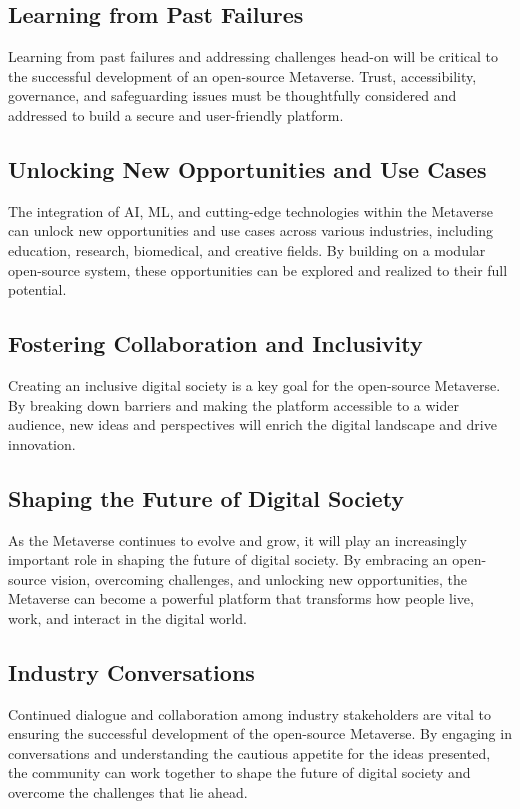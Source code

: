 \subsection{Learning from Past Failures}
Learning from past failures and addressing challenges head-on will be critical to the successful development of an open-source Metaverse. Trust, accessibility, governance, and safeguarding issues must be thoughtfully considered and addressed to build a secure and user-friendly platform.

\subsection{Unlocking New Opportunities and Use Cases}
The integration of AI, ML, and cutting-edge technologies within the Metaverse can unlock new opportunities and use cases across various industries, including education, research, biomedical, and creative fields. By building on a modular open-source system, these opportunities can be explored and realized to their full potential.

\subsection{Fostering Collaboration and Inclusivity}
Creating an inclusive digital society is a key goal for the open-source Metaverse. By breaking down barriers and making the platform accessible to a wider audience, new ideas and perspectives will enrich the digital landscape and drive innovation.

\subsection{Shaping the Future of Digital Society}
As the Metaverse continues to evolve and grow, it will play an increasingly important role in shaping the future of digital society. By embracing an open-source vision, overcoming challenges, and unlocking new opportunities, the Metaverse can become a powerful platform that transforms how people live, work, and interact in the digital world.
\subsection{Industry Conversations}
Continued dialogue and collaboration among industry stakeholders are vital to ensuring the successful development of the open-source Metaverse. By engaging in conversations and understanding the cautious appetite for the ideas presented, the community can work together to shape the future of digital society and overcome the challenges that lie ahead.


